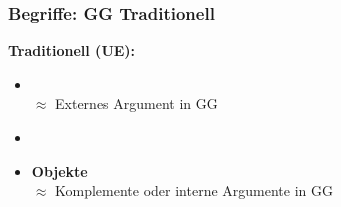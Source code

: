 \begin{frame}
\frametitle{Begriffe: GG \vs Traditionell}

\begin{minipage}[b]{0.4\textwidth}

	\textbf{Traditionell (UE):}
		\begin{itemize}
		\item {}\\
		$\approx$ Externes Argument in GG
		\item[]
		\item \textbf{Objekte}\\
		$\approx$ Komplemente oder interne Argumente in GG
		\end{itemize}	
\end{minipage}  
\begin{minipage}[b]{0.55\textwidth}
	\begin{figure}
	\centering
	\end{figure}	
\end{minipage}

\end{frame}


